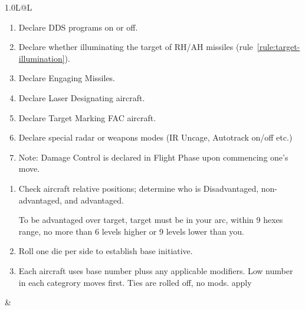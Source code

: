 \begin{twocolumntablefloat}
\begin{twocolumntable}
\begin{tabularx}{1.0\linewidth}{L@{\hspace{\columnsep}}L}
\begin{enumerate}[nosep]
    \item Declare DDS programs on or off.
    \item Declare whether illuminating the target of RH/AH missiles (rule~\ref{rule:target-illumination}).
    \item Declare Engaging Missiles.
    \item Declare Laser Designating aircraft.
    \item Declare Target Marking FAC aircraft.
    \item Declare special radar or weapons modes (IR Uncage, Autotrack on/off etc.)
    \item[--] Note: Damage Control is declared in Flight Phase upon commencing one's move.
\end{enumerate}


\begin{enumerate}[nosep]
    \item Check aircraft relative positions; determine who is Disadvantaged, non-advantaged, and advantaged.

    To be advantaged over target, target must be in your  arc, within 9 hexes range, no more than 6 levels higher or 9 levels lower than you.  

    \item Roll one die per side to establish base initiative.

    \item Each aircraft uses base number pluss any applicable modifiers. Low number in each categrory moves first. Ties are rolled off, no mods. apply
\end{enumerate}

&



\end{tabularx}
\end{twocolumntable}
\end{twocolumntablefloat}
